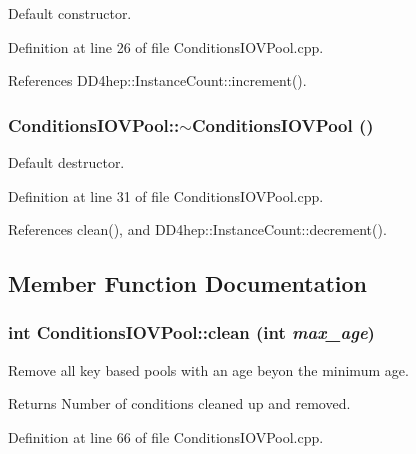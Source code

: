 Default constructor. 

Definition at line 26 of file ConditionsIOVPool.cpp.

References DD4hep::InstanceCount::increment().\hypertarget{class_d_d4hep_1_1_conditions_1_1_conditions_i_o_v_pool_a58a9a1f3f6d282fa24c00010193da303}{
\subsubsection[{$\sim$ConditionsIOVPool}]{\setlength{\rightskip}{0pt plus 5cm}ConditionsIOVPool::$\sim$ConditionsIOVPool ()}}
\label{class_d_d4hep_1_1_conditions_1_1_conditions_i_o_v_pool_a58a9a1f3f6d282fa24c00010193da303}


Default destructor. 

Definition at line 31 of file ConditionsIOVPool.cpp.

References clean(), and DD4hep::InstanceCount::decrement().

\subsection{Member Function Documentation}
\hypertarget{class_d_d4hep_1_1_conditions_1_1_conditions_i_o_v_pool_a3adc9fa6a89d3195b91b5fb11236f360}{
\subsubsection[{clean}]{\setlength{\rightskip}{0pt plus 5cm}int ConditionsIOVPool::clean (int {\em max\_\-age})}}
\label{class_d_d4hep_1_1_conditions_1_1_conditions_i_o_v_pool_a3adc9fa6a89d3195b91b5fb11236f360}


Remove all key based pools with an age beyon the minimum age. \begin{DoxyReturn}{Returns}
Number of conditions cleaned up and removed. 
\end{DoxyReturn}


Definition at line 66 of file ConditionsIOVPool.cpp.

